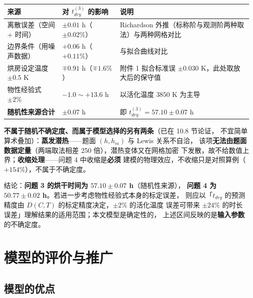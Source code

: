 \begin{center}
\small
\begin{tabular}{p{}p{}p{}}
\toprule[1.2pt]
来源 & 对 $t_{dry}^{(3)}$ 的影响 & 说明 \\
\midrule
离散误差（空间 + 时间） & $\pm0.01$ h（$\pm0.02\%$） & Richardson 外推（标称阶与观测阶两种取法）与两种网格对比 \\
边界条件（用噪声数据） & $+0.06$ h（$+0.11\%$） & 与拟合曲线对比 \\
烘房设定温度 $\pm0.5$ K & $\mp0.91$ h（$\mp1.6\%$） & 附件 1 拟合标准误 $\pm0.030$ K，此处取放大后的保守值 \\
物性经验式 $\pm2\%$ & $-1.0\sim+13.6$ h & 以活化温度 $3850$ K 为主导 \\
\midrule
\textbf{随机性来源合计} & $\pm0.07$ h & 即 $t_{dry}^{(3)}=57.10\pm0.07$ h \\
\bottomrule[1.2pt]
\end{tabular}
\end{center}

\textbf{不属于随机不确定度、而属于模型选择的另有两条}（已在 10.8 节论证，
不宜简单算术叠加）：\textbf{蒸发潜热}——题面 $(h,h_m)$ 与 Lewis 关系不自洽，
该项\textbf{无法由题面数据定量}（两端取法相差 250 倍），潜热变体又在网格加密
下发散，故不给数值上界；\textbf{收缩处理}——问题 4 中收缩是\textbf{必须}
建模的物理效应，不收缩只是对照算例（$+154\%$），不属于不确定度。

结论：\textbf{问题 3 的烘干时间为 $57.10\pm0.07$ h}（随机性来源），
\textbf{问题 4 为 $50.77\pm0.02$ h}。若进一步考虑物性经验式本身的标定误差，
则应以「$t_{dry}$ 的预测精度由 $D(C,T)$ 的标定精度决定，$\pm2\%$ 的活化温度
误差可带来 $\pm24\%$ 的时长误差」理解结果的适用范围；本文模型是确定性的，
上述区间反映的是\textbf{输入参数}的不确定度。
\section{模型的评价与推广}

\subsection{模型的优点}

